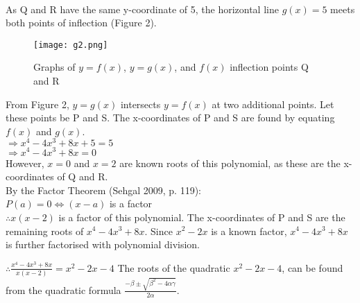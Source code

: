 \documentclass{homework}
\begin{document}
\begin{flushleft}
\begin{paracol}{2}
 \\
\vspace{1.4em}
   As Q and R have the same y-coordinate of 5, the horizontal line $g(x)=5$ meets both points of inflection (Figure 2). \vspace{0.7em}
   \switchcolumn
\begin{figure}[htp]
    \centering
    \texttt{[image: g2.png]}
    \caption{Graphs of $y=f(x)$, $y=g(x)$, and $f(x)$ inflection points Q and R}
    \label{fig:g2}
\end{figure}
\switchcolumn
  \vspace{0.8em}From Figure 2, $y=g(x) $ intersects $y=f(x)$ at two additional points. Let these points be P and S.
    \linebreak \linebreak
    The x-coordinates of P and S are found by equating $f(x)$ and $g(x)$. \vspace{0.5em}\\ 
    $\Rightarrow x^4-4x^3+8x+5=5 $ \vspace{0.5em}\\
    $\Rightarrow x^4-4x^3+8x=0$\vspace{0.5em} \\
    However, $x=0$ and $x=2$ are known roots of this polynomial, as these are the x-coordinates of Q and R.  \vspace{0.9em}\\
    By the Factor Theorem (Sehgal 2009, p. 119): \vspace{0.5em}\\
    $P(a)=0 \Leftrightarrow (x-a)$ is a factor \vspace{0.5em}\\
    $ \therefore x(x-2)$ is a factor of this polynomial. 
     \switchcolumn
     The x-coordinates of P and S are the remaining roots of $x^4-4x^3+8x$. Since $x^2-2x$ is a known factor, $x^4-4x^3+8x$ is further factorised with polynomial division. \vspace{0.8em}\\
    \begin{center}
    \small{}
    \linebreak
    \end{center}
    $\therefore \frac{x^4-4x^3+8x}{x(x-2)}=x^2-2x-4 $ \vspace{1em}\linebreak 
    The roots of the quadratic $x^2-2x-4$, can be found from the quadratic formula $\frac{-\beta\pm \sqrt{\beta^2-4\alpha\gamma}}{2\alpha}$. \vspace{0.8em} \\

\end{paracol}
\end{flushleft}
\end{document}
